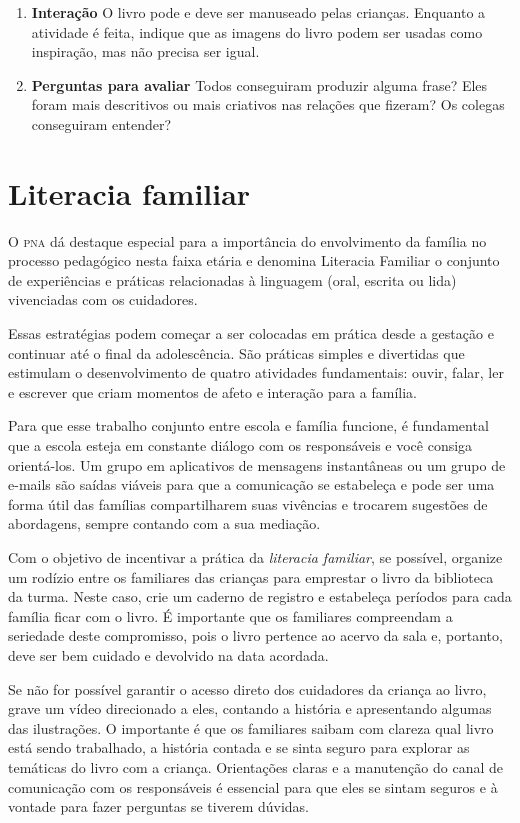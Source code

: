 \documentclass[11pt]{extarticle}
\begin{document}
\begin{enumerate}
\item \textbf{Interação}\quad 
O livro pode e deve ser manuseado pelas crianças. Enquanto a atividade
é feita, indique que as imagens do livro podem ser usadas como 
inspiração, mas não precisa ser igual. 

\item \textbf{Perguntas para avaliar}\quad
Todos conseguiram produzir alguma frase? Eles foram mais descritivos 
ou mais criativos nas relações que fizeram? Os colegas conseguiram entender? 
\end{enumerate}

\section{Literacia familiar}
O \textsc{pna} dá destaque especial para a importância do envolvimento da família 
no processo pedagógico nesta faixa etária e denomina Literacia Familiar o conjunto 
de experiências e práticas relacionadas à linguagem (oral, escrita ou lida) vivenciadas 
com os cuidadores. 

Essas estratégias podem começar a ser colocadas em prática desde a 
gestação e continuar até o final da adolescência. São práticas simples e divertidas 
que estimulam o desenvolvimento de quatro atividades fundamentais: ouvir, falar, 
ler e escrever que criam momentos de afeto e interação para a família. 

Para que esse trabalho conjunto entre escola e família funcione, é 
fundamental que a escola esteja em constante diálogo com os responsáveis e 
você consiga orientá-los. Um grupo em aplicativos de mensagens instantâneas ou um 
grupo de e-mails são saídas viáveis para que a comunicação se estabeleça e pode ser 
uma forma útil das famílias compartilharem suas vivências e trocarem sugestões 
de abordagens, sempre contando com a sua mediação. 

Com o objetivo de incentivar 
a prática da \textit{literacia familiar}, se possível, organize um rodízio entre os familiares 
das crianças para emprestar o livro da biblioteca da turma. Neste caso, crie um caderno 
de registro e estabeleça períodos para cada família ficar com o livro. É importante 
que os familiares compreendam a seriedade deste compromisso, pois o livro pertence 
ao acervo da sala e, portanto, deve ser bem cuidado e devolvido na data acordada. 

Se não for possível garantir o acesso direto dos cuidadores da criança ao livro, 
grave um vídeo direcionado a eles, contando a história e apresentando algumas 
das ilustrações. O importante é que os familiares saibam com clareza qual livro 
está sendo trabalhado, a história contada e se sinta seguro para explorar as temáticas 
do livro com a criança. Orientações claras e a manutenção do canal de comunicação com 
os responsáveis é essencial para que eles se sintam seguros e à vontade para fazer perguntas 
se tiverem dúvidas. 
\end{document}
